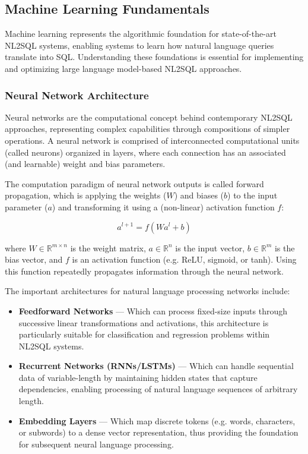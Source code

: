 \subsection{Machine Learning Fundamentals}

Machine learning represents the algorithmic foundation for state-of-the-art
NL2SQL systems, enabling systems to learn how natural language queries
translate into SQL. Understanding these foundations is essential for
implementing and optimizing large language model-based NL2SQL approaches.

\subsubsection{Neural Network Architecture}

Neural networks are the computational concept behind contemporary NL2SQL
approaches, representing complex capabilities through compositions of simpler
operations. A neural network is comprised of interconnected computational units
(called neurons) organized in layers, where each connection has an associated
(and learnable) weight and bias parameters.

The computation paradigm of neural network outputs is called forward
propagation, which is applying the weights ($W$) and biases ($b$) to the input
parameter ($a$) and transforming it using a (non-linear) activation function
$f$:

\begin{equation}
a^{l+1} = f(Wa^l + b)
\end{equation}

where $W \in \mathbb{R}^{m \times n}$ is the weight matrix, $a \in
\mathbb{R}^{n}$ is the input vector, $b \in \mathbb{R}^{m}$ is the bias vector,
and $f$ is an activation function (e.g. ReLU, sigmoid, or tanh). Using this
function repeatedly propagates information through the neural network.

The important architectures for natural language processing networks include:

\begin{itemize}
    \item \textbf{Feedforward Networks} — Which can process fixed-size inputs
        through successive linear transformations and activations, this
        architecture is particularly suitable for classification and regression
        problems within NL2SQL systems.
    \item \textbf{Recurrent Networks (RNNs/LSTMs)} — Which can handle
        sequential data of variable-length by maintaining hidden states that
        capture dependencies, enabling processing of natural language sequences
        of arbitrary length.
    \item \textbf{Embedding Layers} — Which map discrete tokens (e.g. words,
        characters, or subwords) to a dense vector representation, thus
        providing the foundation for subsequent neural language processing.
\end{itemize}

